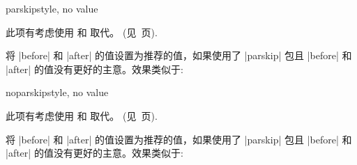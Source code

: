 \begin{docTcbKey}[][doc updated=2017-02-01]{parskip}{}{style, no value}

  此项有考虑使用  和  取代。
  (见~\pageref{subsec:surroundings}页).\par
  将 |before| 和 |after| 的值设置为推荐的值，如果{使用}了 |parskip| 包且 |before| 和 |after| 的值没有更好的主意。效果类似于:
\begin{dispListing}
\end{dispListing}
\end{docTcbKey}

\begin{docTcbKey}[][doc updated=2017-02-01]{noparskip}{}{style, no value}

  此项有考虑使用  和  取代。
  (见~\pageref{subsec:surroundings}页).\par
  将 |before| 和 |after| 的值设置为推荐的值，如果{使用}了 |parskip| 包且 |before| 和 |after| 的值没有更好的主意。效果类似于:
\begin{dispListing}
\end{dispListing}
\end{docTcbKey}



